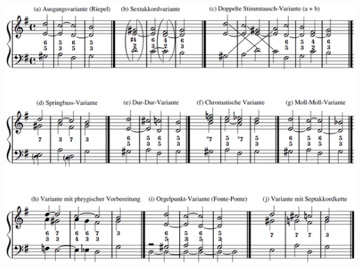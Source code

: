 ﻿\documentclass[11pt, openany]{article}
\begin{document}
\begin{center}
\includegraphics[scale=1]{fontevar.png}
\end{center}
\end{document}
